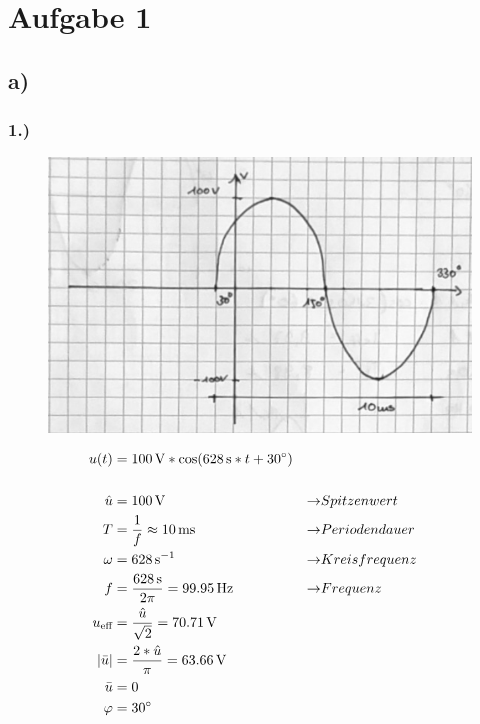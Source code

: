 \documentclass[../../document.tex]{subfiles}
\begin{document}
\section*{Aufgabe 1}

\subsection*{a)}

\subsubsection*{1.)}

\begin{figure}[H]
    \begin{center}
        \includegraphics[width=.9\linewidth]{../../img/aufg1-a-1}
    \end{center}
\end{figure}

\begin{equation*}
    \begin{split}
        u(t) &= \SI{100}{\volt} * \cos(\SI{628}{\second} * t + \SI{30}{\degree})\\\\
        \hat{u} &= \SI{100}{\volt} &\rightarrow &  Spitzenwert\\
        T &= \frac{1}{f} \approx \SI{10}{ms} &\rightarrow &  Periodendauer\\
        \omega &= \SI{628}{\second^{-1}} &\rightarrow &  Kreisfrequenz\\
        f &= \frac{\SI{628}{\second}}{2\pi} = \SI{99,95}{\hertz} &\rightarrow &  Frequenz\\
        u_{\textrm{eff}} &= \frac{\hat{u}}{\sqrt{2}} = \SI{70,71}{\volt}\\
        \left\lvert\bar{u}\right\rvert &= \frac{2 * \hat{u}}{\pi} = \SI{63,66}{\volt}\\ 
        \bar{u} &= 0\\
        \varphi &= \SI{30}{\degree}\\
    \end{split}
\end{equation*}
\end{document}
